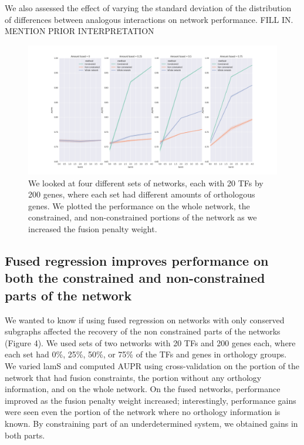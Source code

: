 \documentclass[11pt]{article}
\begin{document}
We also assessed the effect of varying the standard deviation of the distribution of differences between analogous interactions on network performance. FILL IN. MENTION PRIOR INTERPRETATION

\begin{figure}
\begin{center}
  \includegraphics[scale=0.45]{con_noncon.png}
  \caption{\label{fig:figure4} We looked at four different sets of networks, each with 20 TFs by 200 genes, where each set had different amounts of orthologous genes. We plotted the performance on the whole network, the constrained, and non-constrained portions of the network as we increased the fusion penalty weight.}
  \end{center}
\end{figure}

\subsection{Fused regression improves performance on both the constrained and non-constrained parts of the network}
We wanted to know if using fused regression on networks with only conserved subgraphs affected the recovery of the non constrained parts of the networks (Figure 4). We used sets of two networks with 20 TFs and 200 genes each, where each set had 0\%, 25\%, 50\%, or 75\% of the TFs and genes in orthology groups. We varied lamS and computed AUPR using cross-validation on the portion of the network that had fusion constraints, the portion without any orthology information, and on the whole network. On the fused networks, performance improved as the fusion penalty weight increased; interestingly, performance gains were seen even the portion of the network where no orthology information is known. By constraining part of an underdetermined system, we obtained gains in both parts. 
\end{document}
